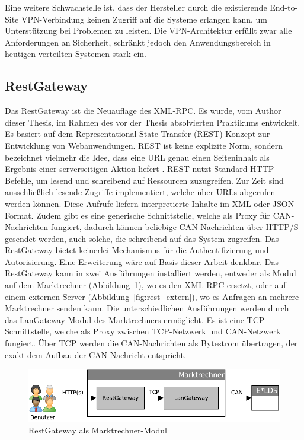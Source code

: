 \documentclass[11pt,a4paper]{report}
\begin{document}
Eine weitere Schwachstelle ist, dass der Hersteller durch die existierende End-to-Site VPN-Verbindung keinen Zugriff auf die Systeme erlangen kann, um Unterstützung bei Problemen zu leisten. Die VPN-Architektur erfüllt zwar alle Anforderungen an Sicherheit, schränkt jedoch den Anwendungsbereich in heutigen verteilten Systemen stark ein.

\subsection{RestGateway} 
Das RestGateway ist die Neuauflage des XML-RPC. Es wurde, vom Author dieser Thesis, im Rahmen des vor der Thesis absolvierten Praktikums entwickelt. Es basiert auf dem Representational State Transfer (REST) Konzept zur Entwicklung von Webanwendungen. REST ist keine explizite Norm, sondern bezeichnet vielmehr die Idee, dass eine URL genau einen Seiteninhalt als Ergebnis einer serverseitigen Aktion liefert \cite{wiki_rest}. REST nutzt Standard HTTP-Befehle, um lesend und schreibend auf Ressourcen zuzugreifen. Zur Zeit sind ausschließlich lesende Zugriffe implementiert, welche über URLs abgerufen werden können. Diese Aufrufe liefern interpretierte Inhalte im XML oder JSON Format. Zudem gibt es eine generische Schnittstelle, welche als Proxy für CAN-Nachrichten fungiert, dadurch können beliebige CAN-Nachrichten über HTTP/S gesendet werden, auch solche, die schreibend auf das System zugreifen. Das RestGateway bietet keinerlei Mechanismus für die Authentifizierung und Autorisierung. Eine Erweiterung wäre auf Basis dieser Arbeit denkbar. Das RestGateway kann in zwei Ausführungen installiert werden, entweder als Modul auf dem Marktrechner (Abbildung~\ref{fig:rest_intern}), wo es den XML-RPC ersetzt, oder auf einem externen Server (Abbildung~\ref{fig:rest_extern}), wo es Anfragen an mehrere Marktrechner senden kann. Die unterschiedlichen Ausführungen werden durch das LanGateway-Modul des Marktrechners ermöglicht. Es ist eine TCP-Schnittstelle, welche als Proxy zwischen TCP-Netzwerk und CAN-Netzwerk fungiert. Über TCP werden die CAN-Nachrichten als Bytestrom übertragen, der exakt dem Aufbau der CAN-Nachricht entspricht.

\begin{figure}[htbp]
\centering
\includegraphics[scale=0.7]{images/RestGateway_intern.pdf}
\caption[]{RestGateway als Marktrechner-Modul}
\label{fig:rest_intern}
\end{figure}
\end{document}
